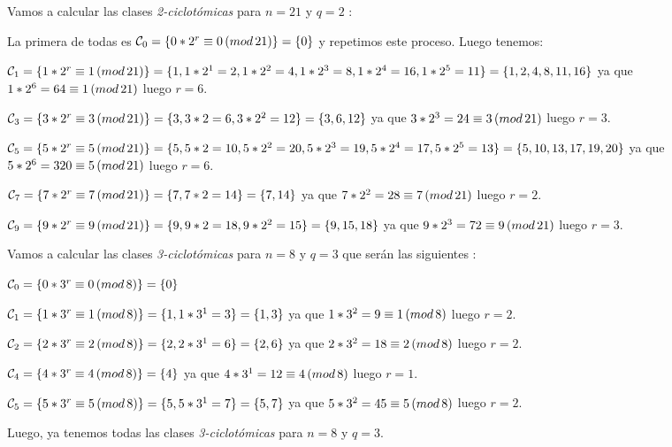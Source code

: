 \begin{exampleth}
\label{ex: clase_mod_quince}
 Vamos a calcular las clases \textit{2-ciclotómicas} para $n=21$ y $q=2$ :

La primera de todas es $\mathcal{C}_0 = \{ 0*2^r \equiv 0 \thinspace (mod \thinspace 21) \} = \{ 0 \} $ y repetimos este proceso. Luego tenemos:

$\mathcal{C}_1 = \{ 1*2^r \equiv 1 \thinspace (mod \thinspace 21) \} = \{ 1, 1*2^1=2, 1*2^2 = 4, 1*2^3 = 8, 1*2^4 = 16,1*2^5 = 11 \} = \{1,2,4,8,11,16\} $
ya que $1*2^6 = 64 \equiv 1 \thinspace (mod \thinspace 21)$ luego $r=6$.

$\mathcal{C}_3 = \{ 3*2^r \equiv 3 \thinspace (mod \thinspace 21) \} = \{ 3,3*2 = 6, 3*2^2 = 12\} = \{3,6,12 \} $ ya que $3*2^3 = 24 \equiv 3 \thinspace (mod \thinspace 21 )$ luego $r=3$.

$\mathcal{C}_5 = \{ 5*2^r \equiv 5 \thinspace (mod \thinspace 21) \} = \{ 5, 5*2=10,5*2^2 = 20, 5*2^3 = 19, 5*2^4 = 17,5*2^5 = 13 \} = \{5,10,13,17,19,20\} $
ya que $5*2^6 = 320 \equiv 5 \thinspace (mod \thinspace 21)$ luego $r=6$.

$\mathcal{C}_7 = \{ 7*2^r \equiv 7 \thinspace (mod \thinspace 21) \} = \{ 7,7*2 = 14 \} = \{ 7,14 \} $ ya que $7*2^2 = 28 \equiv 7 \thinspace (mod \thinspace 21 )$ luego $r=2$.

$\mathcal{C}_9 = \{ 9*2^r \equiv 9 \thinspace (mod \thinspace 21) \} = \{ 9,9*2 = 18,9*2^2 = 15 \} = \{ 9,15,18 \} $ ya que $9*2^3 = 72 \equiv 9 \thinspace (mod \thinspace 21 )$ luego $r=3$.

\end{exampleth}

\begin{exampleth} 
\label{ex:clase_mod_ocho}
Vamos a calcular las clases \textit{3-ciclotómicas} para $n=8$ y $q=3$ que serán las siguientes :

$\mathcal{C}_0 = \{ 0*3^r \equiv 0 \thinspace (mod \thinspace 8) \} = \{ 0 \} $

$\mathcal{C}_1 = \{ 1*3^r \equiv 1 \thinspace (mod \thinspace 8) \} = \{ 1, 1*3^1=3 \} = \{1,3\} $
ya que $1*3^2 = 9 \equiv 1 \thinspace (mod \thinspace 8)$ luego $r=2$.

$\mathcal{C}_2 = \{ 2*3^r \equiv 2 \thinspace (mod \thinspace 8) \} = \{ 2, 2*3^1=6 \} = \{2,6\} $
ya que $2*3^2 = 18 \equiv 2 \thinspace (mod \thinspace 8)$ luego $r=2$.

$\mathcal{C}_4 = \{ 4*3^r \equiv 4 \thinspace (mod \thinspace 8) \} = \{ 4 \} $
ya que $4*3^1 = 12 \equiv 4 \thinspace (mod \thinspace 8)$ luego $r=1$.

$\mathcal{C}_5 = \{ 5*3^r \equiv 5 \thinspace (mod \thinspace 8) \} = \{ 5, 5*3^1=7 \} = \{5,7\} $
ya que $5*3^2 = 45 \equiv 5 \thinspace (mod \thinspace 8)$ luego $r=2$.

Luego, ya tenemos todas las clases \textit{3-ciclotómicas} para $n=8$ y $q=3$.

\end{exampleth}



